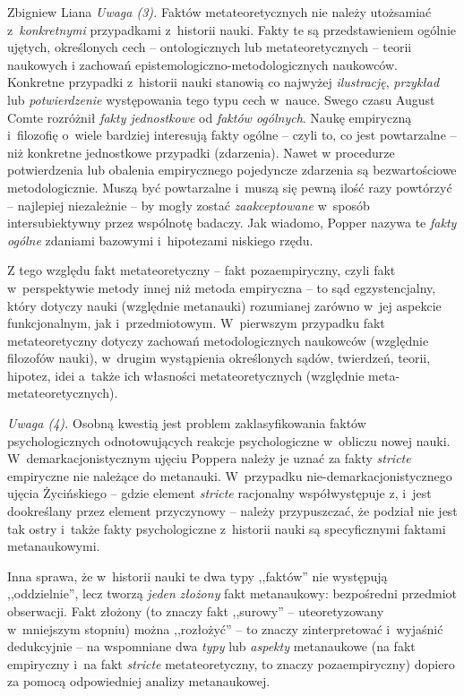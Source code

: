 \begin{artplenv}{Zbigniew Liana}
\textit{Uwaga (3).} Faktów metateoretycznych nie należy utożsamiać z~\textit{konkretnymi} przypadkami z~historii nauki.
Fakty te są przedstawieniem ogólnie ujętych, określonych cech -- ontologicznych lub metateoretycznych -- teorii naukowych
i zachowań epistemologiczno-metodologicznych naukowców. Konkretne przypadki z~historii nauki stanowią co najwyżej
\textit{ilustrację}, \textit{przykład} lub \textit{potwierdzenie} występowania tego typu cech w~nauce. Swego czasu August
Comte rozróżnił \textit{fakty jednostkowe} od \textit{faktów ogólnych}. Naukę empiryczną i~filozofię o~wiele bardziej
interesują fakty ogólne -- czyli to, co jest powtarzalne -- niż konkretne jednostkowe przypadki (zdarzenia). Nawet w
procedurze potwierdzenia lub obalenia empirycznego pojedyncze zdarzenia są bezwartościowe metodologicznie. Muszą być
powtarzalne i~muszą się pewną ilość razy powtórzyć -- najlepiej niezależnie -- by mogły zostać \textit{zaakceptowane} w~sposób
intersubiektywny przez wspólnotę badaczy. Jak wiadomo, Popper nazywa te \textit{fakty ogólne} zdaniami bazowymi i~hipotezami
niskiego rzędu.

Z tego względu fakt metateoretyczny -- fakt pozaempiryczny, czyli fakt w~perspektywie metody innej niż metoda empiryczna
-- to sąd egzystencjalny, który dotyczy nauki (względnie metanauki) rozumianej zarówno w~jej aspekcie funkcjonalnym,
jak i~przedmiotowym. W~pierwszym przypadku fakt metateoretyczny dotyczy zachowań metodologicznych naukowców (względnie
filozofów nauki), w~drugim wystąpienia określonych sądów, twierdzeń, teorii, hipotez, idei a~także ich własności
metateoretycznych (względnie meta-metateoretycznych).

\textit{Uwaga (4).} Osobną kwestią jest problem zaklasyfikowania faktów psychologicznych odnotowujących reakcje
psychologiczne w~obliczu nowej nauki. W~demarkacjonistycznym ujęciu Poppera należy je uznać za fakty \textit{stricte}
empiryczne nie należące do metanauki. W~przypadku nie-demarkacjonistycznego ujęcia Życińskiego -- gdzie element
\textit{stricte} racjonalny współwystępuje z, i~jest dookreślany przez element przyczynowy -- należy przypuszczać, że
podział nie jest tak ostry i~także fakty psychologiczne z~historii nauki są specyficznymi faktami metanaukowymi.

Inna sprawa, że w~historii nauki te dwa typy ,,faktów'' nie występują ,,oddzielnie'', lecz tworzą \textit{jeden}
\textit{złożony} fakt metanaukowy: bezpośredni przedmiot obserwacji. Fakt złożony (to znaczy fakt ,,surowy'' --
uteoretyzowany w~mniejszym stopniu) można ,,rozłożyć'' -- to znaczy zinterpretować i~wyjaśnić dedukcyjnie -- na wspomniane
dwa \textit{typy} lub\textit{ aspekty} metanaukowe (na fakt empiryczny i~na fakt \textit{stricte} metateoretyczny, to znaczy
pozaempiryczny) dopiero za pomocą odpowiedniej analizy metanaukowej.


\end{artplenv}
